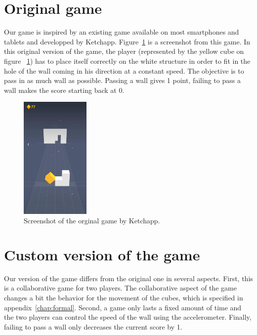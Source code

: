 \documentclass[english, DIV=13]{scrreprt}
\begin{document}
\section{Original game}
Our game is inspired by an existing game available on most smartphones and tablets
and developped by Ketchapp. Figure~\ref{fig:original-game} is a screenshot from this game.
In this original version of the game, the player (represented by the yellow cube on figure
~\ref{fig:original-game}) has to place itself correctly on the white structure in order
to fit in the hole of the wall coming in his direction at a constant speed. The objective
is to pass in as much wall as possible. Passing a wall gives 1 point, failing to pass a
wall makes the score starting back at 0.

\begin{figure}[bth]
    \centering
    \includegraphics[width=0.3\textwidth]{img/original-game}
    \caption{Screenshot of the orginal game by Ketchapp.}
    \label{fig:original-game}
\end{figure}

\section{Custom version of the game}
Our version of the game differs from the original one in several aspects. First, this
is a collaborative game for two players. The collaborative aspect of the game
changes a bit the behavior for the movement of the cubes, which is specified in
appendix~\ref{chap:formal}. Second, a game only lasts a fixed amount of time
and the two players can control the speed of the wall using the accelerometer.
Finally, failing to pass a wall only decreases the current score by 1. 
\end{document}
